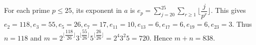 For each prime $p\le25$, its exponent in $a$ is $e_p=\sum_{j=20}^{25}\sum_{r\ge1}\lfloor\dfrac{j}{p^r}\rfloor$. This gives $e_2=118,e_3=55,e_5=26,e_7=17,e_{11}=10,e_{13}=6,e_{17}=6,e_{19}=6,e_{23}=3$. Thus $n=118$ and $m=2^{\lfloor\dfrac{118}{26}\rfloor}3^{\lfloor\dfrac{55}{26}\rfloor}5^{\lfloor\dfrac{26}{26}\rfloor}=2^4 3^2 5=720$. Hence $\boxed{m+n=838}$.
